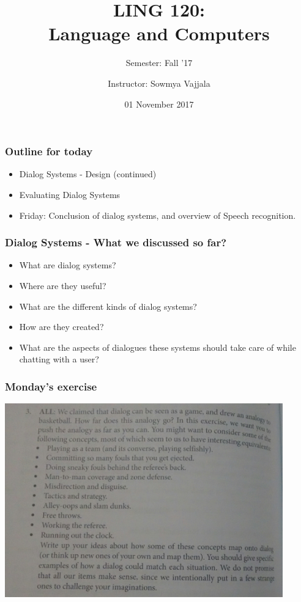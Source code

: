 \documentclass{beamer}
\author[Sowmya Vajjala]{Instructor: Sowmya Vajjala}
\title[LING 120]{LING 120: \\ Language and Computers}
\subtitle{Semester: Fall '17}
\date{01 November 2017}
\institute{Iowa State University, USA}
\begin{document}
\begin{frame}\titlepage
\end{frame}

\begin{frame}
\frametitle{Outline for today}
\begin{itemize}
\item Dialog Systems - Design (continued)
\item Evaluating Dialog Systems
\item Friday: Conclusion of dialog systems, and overview of Speech recognition.
\end{itemize}	
\end{frame}

\begin{frame}
\frametitle{Dialog Systems - What we discussed so far?}
\begin{itemize}
\item What are dialog systems?
\item Where are they useful?
\item What are the different kinds of dialog systems?
\item How are they created?
\item What are the aspects of dialogues these systems should take care of while chatting with a user?
\end{itemize}	
\end{frame}

\begin{frame}
\frametitle{Monday's exercise}
\includegraphics[width=0.9\textwidth]{question.jpg}
\end{frame}
\end{document}
